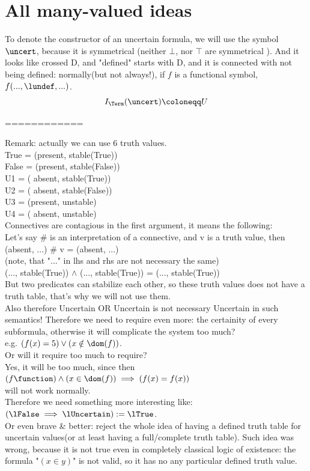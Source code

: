 \def\topic{many-valued}


\section{All many-valued ideas}
To denote the constructor of an uncertain formula, we will use the symbol $\uncert$, because it is symmetrical (neither $\bot$, nor $\top$ are  symmetrical ). And it looks like crossed D, and "defined" starts with D, and it is connected with not being defined: normally(but not always!), if $f$ is a functional symbol, $f(...,\lundef,...)$.\\
\[
I_\Term(\uncert) \coloneqq U
\]

============

Remark: actually we can use 6 truth values.\\
 True = (present, stable(True))\\
False = (present, stable(False))\\
U1    = ( absent, stable(True))\\
U2    = ( absent, stable(False))\\
U3    = (present, unstable)\\
U4    = ( absent, unstable)\\
Connectives are contagious in the first argument, it means the following:\\
Let's say \# is an interpretation of a connective, and v is a truth value, then\\
 (absent, ...) \# v = (absent, ...)\\
 (note, that "..." in lhs and rhs are not necessary the same)\\
 (..., stable(True)) $\land$ (..., stable(True)) =  (..., stable(True))\\
But two predicates can stabilize each other, so these truth values does not have a truth table, that's why we will not use them.\\

Also therefore Uncertain OR Uncertain is not necessary Uncertain in such semantics!
Therefore we need to require even more: the certainity of every subformula, otherwise it will complicate the system too much?\\

e.g. $(f(x)=5) \lor (x\notin\dom(f))$.\\
Or will it require too much to require?\\
Yes, it will be too much, since then\\
$(f\function)\land(x\in\dom(f)) \implies (f(x)=f(x))$\\
will not work normally.\\
Therefore we need something more interesting like:\\
 $(\lFalse\implies\lUncertain) := \lTrue$.\\
Or even brave \& better: reject the whole idea of having a defined truth table for uncertain values(or at least having a full/complete truth table).
Such idea was wrong, because it is not true even in completely classical logic of existence: the formula "$(x\in y)$" is not valid, so it has no any particular defined truth value.\\

